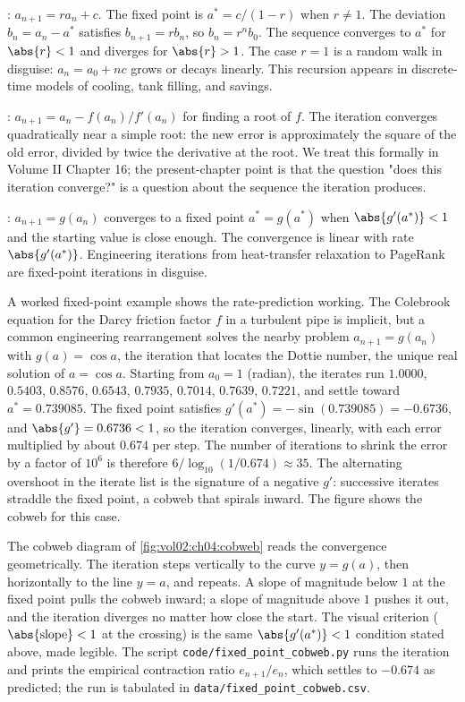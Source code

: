 : $a_{n+1} = r a_{n} + c$. The fixed point is
$a^{*} = c / (1 - r)$ when $r \neq 1$. The deviation $b_{n} = a_{n} -
a^{*}$ satisfies $b_{n+1} = r b_{n}$, so $b_{n} = r^{n} b_{0}$. The
sequence converges to $a^{*}$ for $\abs{r} < 1$ and diverges for
$\abs{r} > 1$. The case $r = 1$ is a random walk in disguise: $a_{n} =
a_{0} + n c$ grows or decays linearly. This recursion appears in
discrete-time models of cooling, tank filling, and savings.

: $a_{n+1} = a_{n} - f(a_{n}) / f'(a_{n})$
for finding a root of $f$. The iteration converges quadratically near
a simple root: the new error is approximately the square of the old
error, divided by twice the derivative at the root. We treat this
formally in Volume II Chapter 16; the present-chapter point is that the
question "does this iteration converge?" is a question about the
sequence the iteration produces.

: $a_{n+1} = g(a_{n})$ converges to a
fixed point $a^{*} = g(a^{*})$ when $\abs{g'(a^{*})} < 1$ and the
starting value is close enough. The convergence is linear with rate
$\abs{g'(a^{*})}$. Engineering iterations from heat-transfer
relaxation to PageRank are fixed-point iterations in disguise.

A worked fixed-point example shows the rate-prediction working. The
Colebrook equation for the Darcy friction factor $f$ in a turbulent
pipe is implicit, but a common engineering rearrangement solves the
nearby problem $a_{n+1} = g(a_{n})$ with $g(a) = \cos a$, the iteration
that locates the Dottie number, the unique real solution of $a =
\cos a$. Starting from $a_{0} = 1$ (radian), the iterates run
$1.0000$, $0.5403$, $0.8576$, $0.6543$, $0.7935$, $0.7014$, $0.7639$,
$0.7221$, and settle toward $a^{*} = 0.739085$. The fixed point
satisfies $g'(a^{*}) = -\sin(0.739085) = -0.6736$, and $\abs{g'} =
0.6736 < 1$, so the iteration converges, linearly, with each error
multiplied by about $0.674$ per step. The number of iterations to
shrink the error by a factor of $10^{6}$ is therefore $6 /
\log_{10}(1/0.674) \approx 35$. The alternating overshoot in the
iterate list is the signature of a negative $g'$: successive iterates
straddle the fixed point, a cobweb that spirals inward. The figure
shows the cobweb for this case.



The cobweb diagram of \autoref{fig:vol02:ch04:cobweb} reads the
convergence geometrically. The iteration steps vertically to the curve
$y = g(a)$, then horizontally to the line $y = a$, and repeats. A slope
of magnitude below $1$ at the fixed point pulls the cobweb inward; a
slope of magnitude above $1$ pushes it out, and the iteration diverges
no matter how close the start. The visual criterion ($\abs{\text{slope}}
< 1$ at the crossing) is the same $\abs{g'(a^{*})} < 1$ condition stated
above, made legible. The script
\texttt{code/fixed\_point\_cobweb.py} runs the iteration and prints the
empirical contraction ratio $e_{n+1}/e_{n}$, which settles to $-0.674$
as predicted; the run is tabulated in
\texttt{data/fixed\_point\_cobweb.csv}.

